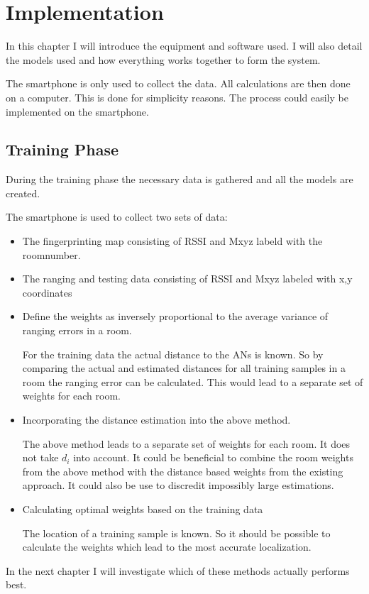 \chapter{Implementation}

\label{Chapter6}

In this chapter I will introduce the equipment and software used. I will also detail the models used and how everything works together to form the system.

The smartphone is only used to collect the data. All calculations are then done on a computer. This is done for simplicity reasons. The process could easily be implemented on the smartphone.

\section{Training Phase}

During the training phase the necessary data is gathered and all the models are created.

The smartphone is used to collect two sets of data:

\begin{itemize}
\item The fingerprinting map consisting of RSSI and Mxyz labeld with the roomnumber.
\item The ranging and testing data consisting of RSSI and Mxyz labeled with x,y coordinates
\end{itemize}

\begin{itemize}
\item Define the weights as inversely proportional to the average variance of ranging errors in a room.

For the training data the actual distance to the ANs is known. So by comparing the actual and estimated distances for all training samples in a room the ranging error can be calculated. This would lead to a separate set of weights for each room.

\item Incorporating the distance estimation into the above method.

The above method leads to a separate set of weights for each room. It does not take \(d_i\) into account. It could be beneficial to combine the room weights from the above method with the distance based weights from the existing approach. It could also be use to discredit impossibly large estimations.
\item Calculating optimal weights based on the training data

The location of a training sample is known. So it should be possible to calculate the weights which lead to the most accurate localization. 
\end{itemize}

In the next chapter I will investigate which of these methods actually performs best.




